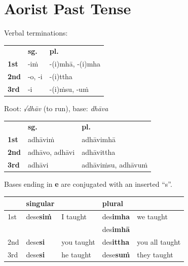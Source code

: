 \documentclass[a4paper]{memoir}
\begin{document}
\section{Aorist Past Tense}
\label{sec:org98537e8}

{\centering\par
\begin{multicols}{2}

Verbal terminations:

\begin{center}
\begin{tabular}{lll}
 & \textbf{sg.} & \textbf{pl.}\\[0pt]
\textbf{1st} & -iṁ & -(i)mhā, -(i)mha\\[0pt]
\textbf{2nd} & -o, -i & -(i)ttha\\[0pt]
\textbf{3rd} & -i & -(i)ṁsu, -uṁ\\[0pt]
\end{tabular}
\end{center}

\columnbreak

Root: \emph{√dhāv} (to run), base: \emph{dhāva}

\begin{center}
\begin{tabular}{lll}
 & \textbf{sg.} & \textbf{pl.}\\[0pt]
\textbf{1st} & adhāviṁ & adhāvimhā\\[0pt]
\textbf{2nd} & adhāvo, adhāvi & adhāvittha\\[0pt]
\textbf{3rd} & adhāvi & adhāviṁsu, adhāvuṁ\\[0pt]
\end{tabular}
\end{center}

\end{multicols}
\par}

Bases ending in \textbf{e} are conjugated with an inserted ``s''.

\begin{center}
\begin{tabular}{lllll}
 & singular &  & plural & \\[0pt]
\hline
1st & dese\textbf{siṁ} & I taught & des\textbf{imha} & we taught\\[0pt]
 &  &  & des\textbf{imhā} & \\[0pt]
2nd & dese\textbf{si} & you taught & des\textbf{ittha} & you all taught\\[0pt]
3rd & dese\textbf{si} & he taught & dese\textbf{suṁ} & they taught\\[0pt]
\end{tabular}
\end{center}
\end{document}
